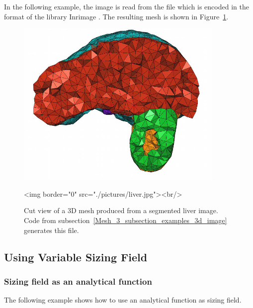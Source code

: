 In the following example, the image is read from the file
 which is encoded in the format of the library Inrimage
.
The resulting mesh is shown in Figure~\ref{figure:liver_3d_image_mesh}.


\begin{figure}[ht]
\begin{center}
 \begin{ccTexOnly}
   \includegraphics[width=10cm]{Mesh_3/pictures/liver}
 \end{ccTexOnly}
 \begin{ccHtmlOnly}
   <img border="0" src="./pictures/liver.jpg"><br/>
 \end{ccHtmlOnly}
 \caption{Cut view of a 3D mesh produced from a segmented liver image. Code from
 subsection~\ref{Mesh_3_subsection_examples_3d_image} generates this file.}
  \label{figure:liver_3d_image_mesh}
\end{center}
\end{figure}

\subsection{Using Variable Sizing Field}

\subsubsection{Sizing field as an analytical function}
\label{Mesh_3_subsubsection_examples_sphere_variable}

The following example shows how to use an analytical function as sizing field.

